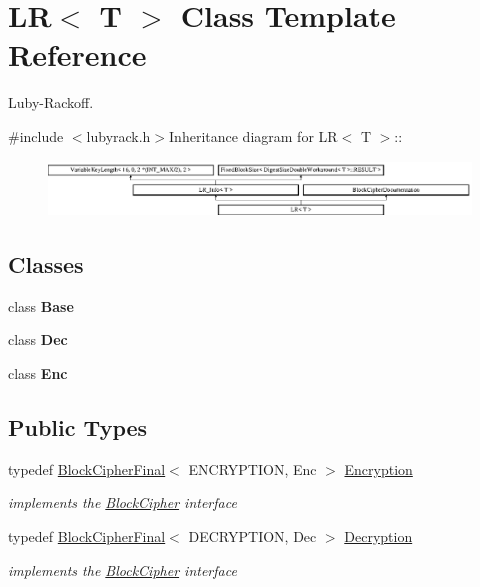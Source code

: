 \hypertarget{class_l_r}{
\section{LR$<$ T $>$ Class Template Reference}
\label{class_l_r}
}


Luby-\/Rackoff.  


{\ttfamily \#include $<$lubyrack.h$>$}Inheritance diagram for LR$<$ T $>$::\begin{figure}[H]
\begin{center}
\leavevmode
\includegraphics[height=1.46982cm]{class_l_r}
\end{center}
\end{figure}
\subsection*{Classes}
\begin{DoxyCompactItemize}
\item 
class {\bfseries Base}
\item 
class {\bfseries Dec}
\item 
class {\bfseries Enc}
\end{DoxyCompactItemize}
\subsection*{Public Types}
\begin{DoxyCompactItemize}
\item 
\hypertarget{class_l_r_a872ccddac2de9968be4e450c2fca16a8}{
typedef \hyperlink{class_block_cipher_final}{BlockCipherFinal}$<$ ENCRYPTION, Enc $>$ \hyperlink{class_l_r_a872ccddac2de9968be4e450c2fca16a8}{Encryption}}
\label{class_l_r_a872ccddac2de9968be4e450c2fca16a8}

\begin{DoxyCompactList}\small\item\em implements the \hyperlink{class_block_cipher}{BlockCipher} interface \item\end{DoxyCompactList}\item 
\hypertarget{class_l_r_a15edf97ef5951c2963bf5e24f5198678}{
typedef \hyperlink{class_block_cipher_final}{BlockCipherFinal}$<$ DECRYPTION, Dec $>$ \hyperlink{class_l_r_a15edf97ef5951c2963bf5e24f5198678}{Decryption}}
\label{class_l_r_a15edf97ef5951c2963bf5e24f5198678}

\begin{DoxyCompactList}\small\item\em implements the \hyperlink{class_block_cipher}{BlockCipher} interface \item\end{DoxyCompactList}\end{DoxyCompactItemize}


